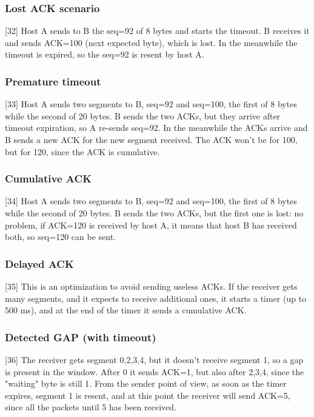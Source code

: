\subsubsection{Lost ACK scenario}
[32] Host A sends to B the seq=92 of 8 bytes and starts the timeout. B receives it and sends ACK=100 (next expected byte), which is lost. In the meanwhile the timeout is expired, so the seq=92 is resent by host A.

\subsubsection{Premature timeout}
[33] Host A sends two segments to B, seq=92 and seq=100, the first of 8 bytes while the second of 20 bytes. B sends the two ACKs, but they arrive after timeout expiration, so A re-sends seq=92. In the meanwhile the ACKs arrive and B sends a new ACK for the new segment received. The ACK won't be for 100, but for 120, since the ACK is cumulative.

\subsubsection{Cumulative ACK}
[34] Host A sends two segments to B, seq=92 and seq=100, the first of 8 bytes while the second of 20 bytes. B sends the two ACKs, but the first one is lost: no problem, if ACK=120 is received by host A, it means that host B has received both, so seq=120 can be sent.

\subsubsection{Delayed ACK}
[35] This is an optimization to avoid sending useless ACKs. If the receiver gets many segments, and it expects to receive additional ones, it starts a timer (up to 500 ms), and at the end of the timer it sends a cumulative ACK.

\subsubsection{Detected GAP (with timeout)}
[36] The receiver gets segment 0,2,3,4, but it doesn't receive segment 1, so a gap is present in the window. After 0 it sends ACK=1, but also after 2,3,4, since the "waiting" byte is still 1. From the sender point of view, as soon as the timer expires, segment 1 is resent, and at this point the receiver will send ACK=5, since all the packets until 5 has been received.

